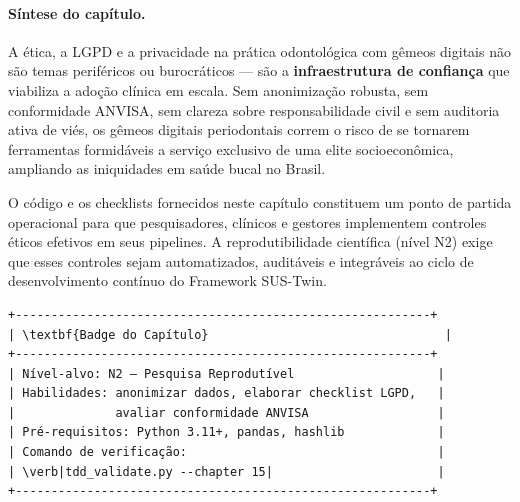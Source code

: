 \paragraph{Síntese do capítulo.}
A ética, a LGPD e a privacidade na prática odontológica com gêmeos digitais não são temas periféricos ou burocráticos — são a \textbf{infraestrutura de confiança} que viabiliza a adoção clínica em escala. Sem anonimização robusta, sem conformidade ANVISA, sem clareza sobre responsabilidade civil e sem auditoria ativa de viés, os gêmeos digitais periodontais correm o risco de se tornarem ferramentas formidáveis a serviço exclusivo de uma elite socioeconômica, ampliando as iniquidades em saúde bucal no Brasil.

O código e os checklists fornecidos neste capítulo constituem um ponto de partida operacional para que pesquisadores, clínicos e gestores implementem controles éticos efetivos em seus pipelines. A reprodutibilidade científica (nível N2) exige que esses controles sejam automatizados, auditáveis e integráveis ao ciclo de desenvolvimento contínuo do Framework SUS-Twin.

\label{ch:etica}

\begin{center}
\begin{tcolorbox}[colback=bgalt, colframe=accent,
    sharp corners, boxrule=1.5pt, width=\textwidth]
\small
\begin{verbatim}
+----------------------------------------------------------+
| \textbf{Badge do Capítulo}                                 |
+----------------------------------------------------------+
| Nível-alvo: N2 — Pesquisa Reprodutível                    |
| Habilidades: anonimizar dados, elaborar checklist LGPD,   |
|              avaliar conformidade ANVISA                  |
| Pré-requisitos: Python 3.11+, pandas, hashlib             |
| Comando de verificação:                                   |
| \verb|tdd_validate.py --chapter 15|                       |
+----------------------------------------------------------+
\end{verbatim}
\end{tcolorbox}
\end{center}

